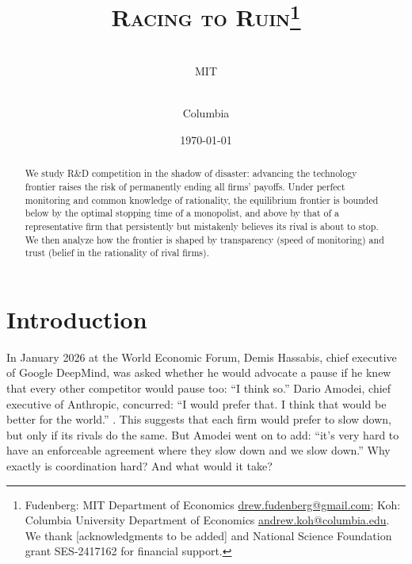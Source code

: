 \documentclass[12pt,reqno]{article}
\theoremstyle{definition} \newtheorem{example}{Example}
\theoremstyle{definition} \newtheorem{condition}{Condition}
\theoremstyle{definition} \newtheorem{corollary}{Corollary}
\theoremstyle{definition} \newtheorem{claim}{Claim}
\theoremstyle{definition} \newtheorem{definition}{Definition}
\theoremstyle{definition} \newtheorem{conjecture}{Conjecture}
\theoremstyle{definition} \newtheorem{Lemma}{Lemma}
\theoremstyle{definition} \newtheorem{lemma}{Lemma}
\theoremstyle{plain} \newtheorem{theorem}{Theorem}
\theoremstyle{definition} \newtheorem{assumption}{Assumption}
\theoremstyle{definition} \newtheorem*{assumptionnonumber}{Assumption}
\theoremstyle{definition} \newtheorem*{theoremNoNumber}{Proposition}
\theoremstyle{definition}
\theoremstyle{definition}\newtheorem{proposition}{Proposition}
\theoremstyle{definition} \newtheorem{result}{Result}
\theoremstyle{definition} \newtheorem*{definitionNoNumber}{Definition}
\theoremstyle{definition} \newtheorem{Definition}{Definition}
\theoremstyle{definition} \newtheorem*{DefinitionNoNumber}{Definition}
\theoremstyle{definition} \newtheorem*{fact}{Fact}
\theoremstyle{definition} \newtheorem*{property}{Property}
\theoremstyle{definition} \newtheorem{remark}{Remark}
\begin{document}
\title{\textsc{Racing to Ruin}\thanks{Fudenberg: MIT Department of Economics \url{drew.fudenberg@gmail.com}; Koh: Columbia University Department of Economics \url{andrew.koh@columbia.edu}. We thank [acknowledgments to be added] and National Science Foundation  grant SES-2417162 for financial support.}}


\author{\\ \normalsize{MIT} \\  
\and {}\\ \normalsize{Columbia}}


\date{\today}
\maketitle
\begin{abstract}
We study R\&D competition in the shadow of disaster: advancing the technology frontier raises the risk of permanently ending all firms’ payoffs. Under perfect monitoring and common knowledge of rationality, the equilibrium frontier is bounded below by the optimal stopping time of a monopolist, and above by that of a representative firm that persistently but mistakenly believes its rival is about to stop. We then analyze how the frontier is shaped by transparency (speed of monitoring) and trust (belief in the rationality of rival firms). %



\end{abstract}

\thispagestyle{empty} \vspace{-1em}

\newpage \setcounter{page}{1}


\section{Introduction} 

 


In January 2026 at the World Economic Forum, Demis Hassabis, chief executive of Google DeepMind, was asked whether he would advocate a pause if he knew that every other competitor would pause too: ``I think so.'' Dario Amodei, chief executive of Anthropic, concurred: ``I would prefer that. I think that would be better for the world.'' \citep{hashim2026davos}. This suggests that each firm would prefer to slow down, but only if its rivals do the same. But Amodei went on to add: ``it's very hard to have an enforceable agreement where they slow down and we slow down.'' Why exactly is coordination hard? And what would it take? 
\end{document}
